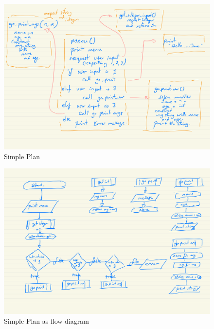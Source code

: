 \documentclass[a4paper,12pt]{article}
\begin{document}
\begin{figure}[!ht]
	\centering
	\includegraphics[width=15cm]{function_plan_1.pdf}
	\caption*{Simple Plan}
\end{figure}

\begin{figure}[!ht]
	\centering
	\includegraphics[width=15cm]{function_plan_2_flow_diagram.pdf}
	\caption*{Simple Plan as flow diagram}
\end{figure}
\end{document}
